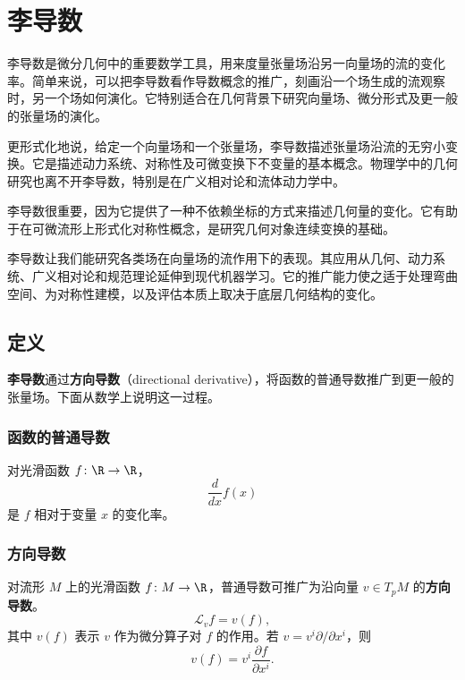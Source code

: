 \section{李导数}
李导数是微分几何中的重要数学工具，用来度量张量场沿另一向量场的流的变化率。简单来说，可以把李导数看作导数概念的推广，刻画沿一个场生成的流观察时，另一个场如何演化。它特别适合在几何背景下研究向量场、微分形式及更一般的张量场的演化。

更形式化地说，给定一个向量场和一个张量场，李导数描述张量场沿流的无穷小变换。它是描述动力系统、对称性及可微变换下不变量的基本概念。物理学中的几何研究也离不开李导数，特别是在广义相对论和流体动力学中。

李导数很重要，因为它提供了一种不依赖坐标的方式来描述几何量的变化。它有助于在可微流形上形式化对称性概念，是研究几何对象连续变换的基础。

李导数让我们能研究各类场在向量场的流作用下的表现。其应用从几何、动力系统、广义相对论和规范理论延伸到现代机器学习。它的推广能力使之适于处理弯曲空间、为对称性建模，以及评估本质上取决于底层几何结构的变化。

\subsection{定义}
\textbf{李导数}通过\textbf{方向导数}（directional derivative），将函数的普通导数推广到更一般的张量场。下面从数学上说明这一过程。

\subsubsection{函数的普通导数}
对光滑函数 $f\colon\R\to\R$，
\[
  \frac{d}{dx}f(x)
\]
是 $f$ 相对于变量 $x$ 的变化率。

\subsubsection{方向导数}
对流形 $M$ 上的光滑函数 $f\colon M\to\R$，普通导数可推广为沿向量 $v\in T_pM$ 的\textbf{方向导数}。
\[
  \mathcal L_v f=v(f),
\]
其中 $v(f)$ 表示 $v$ 作为微分算子对 $f$ 的作用。若 $v=v^i\partial/\partial x^i$，则
\[
  v(f)=v^i\frac{\partial f}{\partial x^i}.
\]

